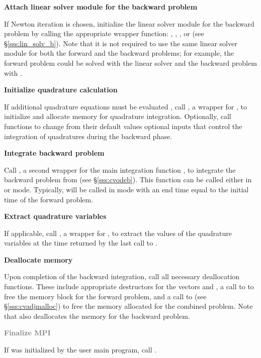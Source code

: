 \begin{Steps}
\item \label{i:lin_solverB}
  {\bf Attach linear solver module for the backward problem}

  If Newton iteration is chosen, initialize the linear solver module 
  for the backward problem by calling the appropriate wrapper
  function: , , ,
  or  (see \S\ref{sss:lin_solv_b}). Note that it is not required
  to use the same linear solver module for both the forward and the 
  backward problems; for example, the forward problem could be solved
  with the {\cvdense} linear solver and the backward problem with {\cvspgmr}.

\item \label{i:quadB}
  {\bf Initialize quadrature calculation}

  If additional quadrature equations must be evaluated , 
  call , a wrapper for ,
  to initialize and allocate memory for quadrature integration.
  Optionally, call  functions to change from their
  default values optional inputs that control the integration of
  quadratures during the backward phase.

\item
  {\bf Integrate backward problem}

  Call , a second wrapper for the {\cvodes} main integration
  function , to integrate the backward problem from 
  (see \S\ref{sss:cvodeb}). This function can be called either in 
  or  mode. Typically,  will be called in 
  mode with an end time equal to the initial time of the forward problem.

\item \label{i:back_end}
  {\bf Extract quadrature variables}

  If applicable, call , a wrapper for ,
  to extract the values of the quadrature variables at the time returned
  by the last call to .

\item
  {\bf Deallocate memory}

  Upon completion of the backward integration, call all necessary deallocation
  functions. These include appropriate destructors for the vectors 
   and , a call to  to free the {\cvodes} memory block 
  for the forward problem, and a call to  (see \S\ref{sss:cvadjmalloc}) to free 
  the memory allocated for the combined problem. 
  Note that  also deallocates the {\cvodes} memory for the backward problem.

\item
  \textcolor{gray}{\bf Finalize MPI}

  {\p} If {\mpi} was initialized by the user main program, call .

\end{Steps}

